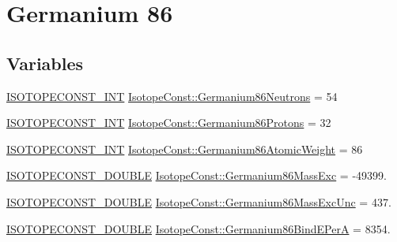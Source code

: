 \hypertarget{group___isotope_const-_germanium-_ge86}{}\section{Germanium 86}
\label{group___isotope_const-_germanium-_ge86}
\subsection*{Variables}
\begin{DoxyCompactItemize}
\item 
\mbox{\hyperlink{group___isotope_const-_macros_ga5f18360b3e99483a35c32d789e62621c}{I\+S\+O\+T\+O\+P\+E\+C\+O\+N\+S\+T\+\_\+\+I\+NT}} \mbox{\hyperlink{group___isotope_const-_germanium-_ge86_ga00cee77f89ae55ff48a99d849040a044}{Isotope\+Const\+::\+Germanium86\+Neutrons}} = 54
\item 
\mbox{\hyperlink{group___isotope_const-_macros_ga5f18360b3e99483a35c32d789e62621c}{I\+S\+O\+T\+O\+P\+E\+C\+O\+N\+S\+T\+\_\+\+I\+NT}} \mbox{\hyperlink{group___isotope_const-_germanium-_ge86_ga0ace2089b0f86239995d04471561ab7c}{Isotope\+Const\+::\+Germanium86\+Protons}} = 32
\item 
\mbox{\hyperlink{group___isotope_const-_macros_ga5f18360b3e99483a35c32d789e62621c}{I\+S\+O\+T\+O\+P\+E\+C\+O\+N\+S\+T\+\_\+\+I\+NT}} \mbox{\hyperlink{group___isotope_const-_germanium-_ge86_ga7309a500a4c5a227be2d883dcd72f460}{Isotope\+Const\+::\+Germanium86\+Atomic\+Weight}} = 86
\item 
\mbox{\hyperlink{group___isotope_const-_macros_ga8f45a7272ce02c0b4c65c44636ed719a}{I\+S\+O\+T\+O\+P\+E\+C\+O\+N\+S\+T\+\_\+\+D\+O\+U\+B\+LE}} \mbox{\hyperlink{group___isotope_const-_germanium-_ge86_ga9f983a2d92bbca11905621ef719c37ed}{Isotope\+Const\+::\+Germanium86\+Mass\+Exc}} = -\/49399.
\item 
\mbox{\hyperlink{group___isotope_const-_macros_ga8f45a7272ce02c0b4c65c44636ed719a}{I\+S\+O\+T\+O\+P\+E\+C\+O\+N\+S\+T\+\_\+\+D\+O\+U\+B\+LE}} \mbox{\hyperlink{group___isotope_const-_germanium-_ge86_gafe7c04360c266c048c195038bdd7fb25}{Isotope\+Const\+::\+Germanium86\+Mass\+Exc\+Unc}} = 437.
\item 
\mbox{\hyperlink{group___isotope_const-_macros_ga8f45a7272ce02c0b4c65c44636ed719a}{I\+S\+O\+T\+O\+P\+E\+C\+O\+N\+S\+T\+\_\+\+D\+O\+U\+B\+LE}} \mbox{\hyperlink{group___isotope_const-_germanium-_ge86_gabc980182c41f2ac0bcf50b2ebfe63d94}{Isotope\+Const\+::\+Germanium86\+Bind\+E\+PerA}} = 8354.
\item 

\end{DoxyCompactItemize}
